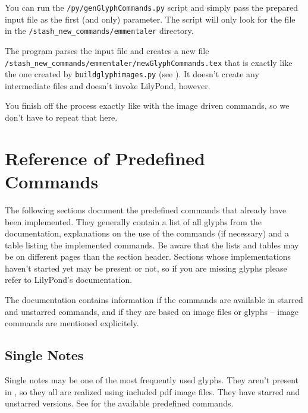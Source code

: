 \documentclass{article}
\begin{document}
You can run the \texttt{/py/genGlyphCommands.py} script and simply pass the prepared input file as the first (and only) parameter.
The script will only look for the file in the \texttt{/stash\_new\_commands/emmentaler} directory.

The program parses the input file and creates a new file \texttt{/stash\_new\_commands/emmentaler/newGlyphCommands.tex} that is exactly like the one created by \texttt{buildglyphimages.py} (see ).
It doesn't create any intermediate files and doesn't invoke LilyPond, however.

You finish off the process exactly like with the image driven commands, so we don't have to repeat that here.

\pagebreak
\section{Reference of Predefined Commands}
\label{sec:list_predefined_commands}
The following sections document the predefined commands that already have been implemented.
They generally contain a list of all glyphs from the \emmentaler documentation, explanations on the use of the commands (if necessary) and a table listing the implemented commands.
Be aware that the lists and tables may be on different pages than the section header.
Sections whose implementations haven't started yet may be present or not, so if you are missing glyphs please refer to LilyPond's documentation.

The documentation contains information if the commands are available in starred and unstarred commands, and if they are based on image files or \emmentaler glyphs -- image commands are mentioned explicitely.

\subsection{Single Notes}
\label{subsec:singlenotes}
Single notes may be one of the most frequently used glyphs.
They aren't present in \emmentaler, so they all are realized using included pdf image files.
They have starred and unstarred versions.
See  for the available predefined commands.
\end{document}
